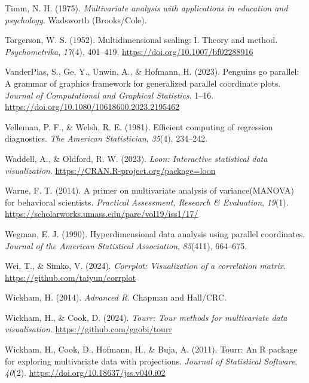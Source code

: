 \documentclass[
  letterpaper,
  10pt,
  krantz2]{krantz}
\newlength{\cslhangindent}
\newenvironment{CSLReferences}[2] %
 {\begin{list}{}{%
  \setlength{\itemindent}{0pt}
  \setlength{\leftmargin}{0pt}
  \setlength{\parsep}{0pt}
  \ifodd #1
   \setlength{\leftmargin}{\cslhangindent}
   \setlength{\itemindent}{-1\cslhangindent}
  \fi
  \setlength{\itemsep}{#2\baselineskip}}}
 {\end{list}}
\begin{document}
\begin{CSLReferences}{1}{0}
Timm, N. H. (1975). \emph{Multivariate analysis with applications in
education and psychology}. Wadsworth (Brooks/Cole).

Torgerson, W. S. (1952). Multidimensional scaling: I. Theory and method.
\emph{Psychometrika}, \emph{17}(4), 401--419.
\url{https://doi.org/10.1007/bf02288916}

VanderPlas, S., Ge, Y., Unwin, A., \& Hofmann, H. (2023). Penguins go
parallel: A grammar of graphics framework for generalized parallel
coordinate plots. \emph{Journal of Computational and Graphical
Statistics}, 1--16. \url{https://doi.org/10.1080/10618600.2023.2195462}

Velleman, P. F., \& Welsh, R. E. (1981). Efficient computing of
regression diagnostics. \emph{The American Statistician}, \emph{35}(4),
234--242.

Waddell, A., \& Oldford, R. W. (2023). \emph{Loon: Interactive
statistical data visualization}.
\url{https://CRAN.R-project.org/package=loon}

Warne, F. T. (2014). A primer on multivariate analysis of
variance(MANOVA) for behavioral scientists. \emph{Practical Assessment,
Research \& Evaluation}, \emph{19}(1).
\url{https://scholarworks.umass.edu/pare/vol19/iss1/17/}

Wegman, E. J. (1990). Hyperdimensional data analysis using parallel
coordinates. \emph{Journal of the American Statistical Association},
\emph{85}(411), 664--675.

Wei, T., \& Simko, V. (2024). \emph{Corrplot: Visualization of a
correlation matrix}. \url{https://github.com/taiyun/corrplot}

Wickham, H. (2014). \emph{{Advanced R}}. {Chapman and Hall/CRC}.

Wickham, H., \& Cook, D. (2024). \emph{Tourr: Tour methods for
multivariate data visualisation}. \url{https://github.com/ggobi/tourr}

Wickham, H., Cook, D., Hofmann, H., \& Buja, A. (2011). Tourr: An {R}
package for exploring multivariate data with projections. \emph{Journal
of Statistical Software}, \emph{40}(2).
\url{https://doi.org/10.18637/jss.v040.i02}


\end{CSLReferences}
\end{document}
